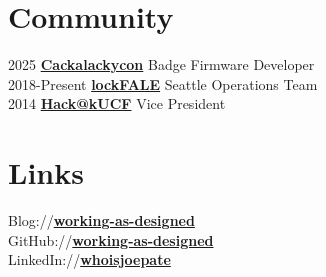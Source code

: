\documentclass[letterpaper]{deedy-resume} %
\begin{document}
\begin{minipage}[t]{0.33\textwidth}
\sectionspace %


\section{Community}
2025 \textbf{\href{https://github.com/lockfale/cackalackybadgyfirmware2025}{Cackalackycon}} Badge Firmware Developer \\
2018-Present \textbf{\href{https://github.com/lockfale}{lockFALE}} Seattle Operations Team \\
2014 \textbf{\href{https://www.hackucf.org/}{Hack@kUCF}} Vice President \\
\sectionspace %


\section{Links}

Blog://\href{https://working-as-designed.github.io/}{\bf working-as-designed} \\
GitHub://\href{https://github.com/working-as-designed}{\bf working-as-designed} \\
LinkedIn://\href{https://linkedin.com/in/whoisjoepate/}{\bf whoisjoepate} \\

\sectionspace %


\end{minipage} %
\hfill
%
%
\end{document}
